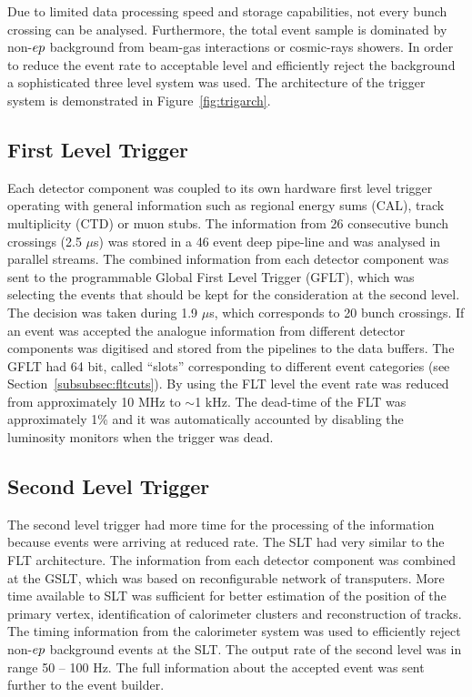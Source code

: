 Due to limited data processing speed and storage capabilities, not every bunch crossing can be analysed. Furthermore, the total event sample is dominated by non-$\mbox{$e p$}$ background from beam-gas interactions or cosmic-rays showers. In order to reduce the event rate to acceptable level and efficiently reject the background a sophisticated three level system was used. The architecture of the \zeus trigger system is demonstrated in Figure~\ref{fig:trigarch}. 

\subsection{First Level Trigger}
\label{subsec:flt} Each detector component was coupled to its own hardware first level trigger operating with general information such as regional energy sums (CAL), track multiplicity (CTD) or muon stubs. The information from 26 consecutive bunch crossings (2.5 $\mu$s) was stored in a 46 event deep pipe-line and was analysed in parallel streams. The combined information from each detector component was sent to the programmable Global First Level Trigger (GFLT), which was selecting the events that should be kept for the consideration at the second level. The decision was taken during 1.9 $\mu$s, which corresponds to 20 bunch crossings. If an event was accepted the analogue information from different detector components was digitised and stored from the pipelines to the data buffers. The GFLT had 64 bit, called ``slots'' corresponding to different event categories (see Section~\ref{subsubsec:fltcuts}). By using the FLT level the event rate was reduced from approximately 10 MHz to $\sim$1 kHz. The dead-time of the FLT was approximately 1\% and it was automatically accounted by disabling the luminosity monitors when the trigger was dead.

\subsection{Second Level Trigger}
\label{subsec:slt}
The second level trigger had more time for the processing of the information because events were arriving at reduced rate. The SLT had very similar to the FLT architecture. The information from each detector component was combined at the GSLT, which was based on reconfigurable network of transputers. More time available to SLT was sufficient for better estimation of the position of the primary vertex, identification of  calorimeter clusters and reconstruction of tracks. The timing information from the calorimeter system was used to efficiently reject non-$\mbox{$e p$}$ background events at the SLT. The output rate of the second level was in range 50 -- 100 Hz. The full information about the accepted event was sent further to the event builder.

